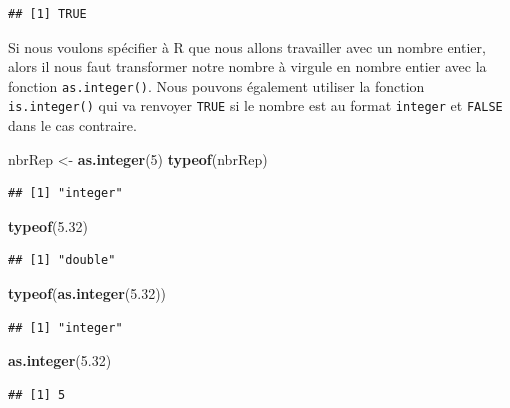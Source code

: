 \documentclass[twoside,symmetric]{book}
\newenvironment{Shaded}{}{}
\newcommand{\DecValTok}[1]{#1}
\newcommand{\FloatTok}[1]{#1}
\newcommand{\KeywordTok}[1]{\textbf{#1}}
\newcommand{\NormalTok}[1]{#1}
\newcommand{\StringTok}[1]{#1}
\begin{document}
\begin{verbatim}
## [1] TRUE
\end{verbatim}

Si nous voulons spécifier à R que nous allons travailler avec un nombre entier, alors il nous faut transformer notre nombre à virgule en nombre entier avec la fonction \texttt{as.integer()}. Nous pouvons également utiliser la fonction \texttt{is.integer()} qui va renvoyer \texttt{TRUE} si le nombre est au format \texttt{integer} et \texttt{FALSE} dans le cas contraire.

\begin{Shaded}
\begin{Highlighting}[]
\NormalTok{nbrRep <-}\StringTok{ }\KeywordTok{as.integer}\NormalTok{(}\DecValTok{5}\NormalTok{)}
\KeywordTok{typeof}\NormalTok{(nbrRep)}
\end{Highlighting}
\end{Shaded}

\begin{verbatim}
## [1] "integer"
\end{verbatim}

\begin{Shaded}
\begin{Highlighting}[]
\KeywordTok{typeof}\NormalTok{(}\FloatTok{5.32}\NormalTok{)}
\end{Highlighting}
\end{Shaded}

\begin{verbatim}
## [1] "double"
\end{verbatim}

\begin{Shaded}
\begin{Highlighting}[]
\KeywordTok{typeof}\NormalTok{(}\KeywordTok{as.integer}\NormalTok{(}\FloatTok{5.32}\NormalTok{))}
\end{Highlighting}
\end{Shaded}

\begin{verbatim}
## [1] "integer"
\end{verbatim}

\begin{Shaded}
\begin{Highlighting}[]
\KeywordTok{as.integer}\NormalTok{(}\FloatTok{5.32}\NormalTok{)}
\end{Highlighting}
\end{Shaded}

\begin{verbatim}
## [1] 5
\end{verbatim}
\end{document}
